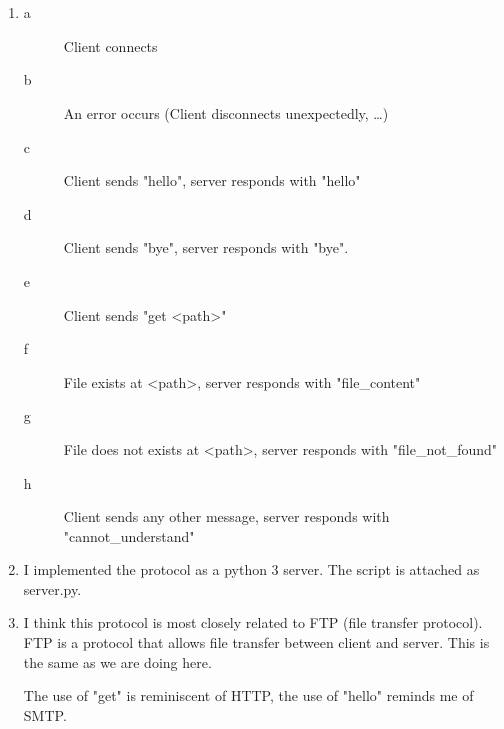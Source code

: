 \documentclass[12pt, a4paper]{article}
\begin{document}
\section{} %
\begin{enumerate}[a]
	\item %

	\begin{description}
		\item[a] Client connects
		\item[b] An error occurs (Client disconnects unexpectedly, \dots)
		\item[c] Client sends "hello", server responds with "hello"
		\item[d] Client sends "bye", server responds with "bye".
		\item[e] Client sends "get <path>"
		\item[f] File exists at <path>, server responds with "file\_content"
		\item[g] File does not exists at <path>, server responds with "file\_not\_found"
		\item[h] Client sends any other message, server responds with "cannot\_understand"
	\end{description}

	\item %
	I implemented the protocol as a python 3 server. The script is attached as server.py.

	\item %
	I think this protocol is most closely related to FTP (file transfer protocol). FTP is a protocol that allows file transfer between client and server. This is the same as we are doing here.

	The use of "get" is reminiscent of HTTP, the use of "hello" reminds me of SMTP.
\end{enumerate}
\end{document}
